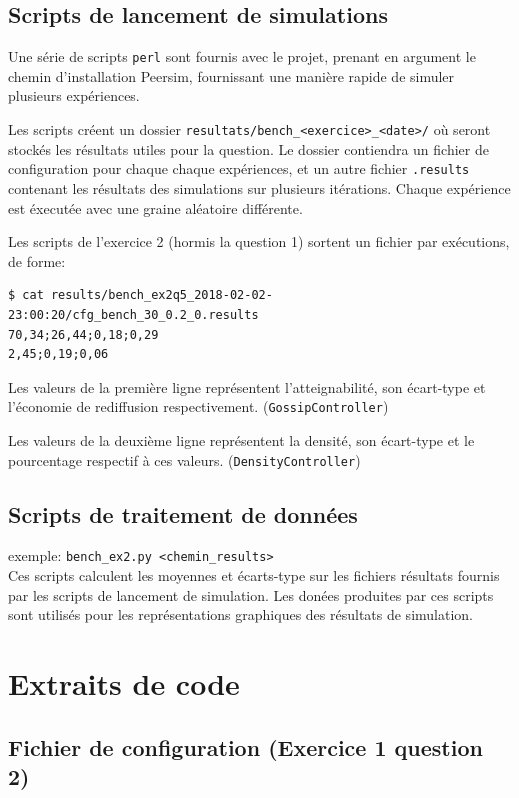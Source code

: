 \documentclass[a4paper]{article}
\begin{document}
\begin{appendix}
    \subsection{Scripts de lancement de simulations}
    Une série de scripts \texttt{perl} sont fournis avec le projet,
    prenant en argument le chemin d'installation Peersim, fournissant
    une manière rapide de simuler plusieurs expériences.

    Les scripts créent un dossier \texttt{resultats/bench\_<exercice>\_<date>/} où seront stockés les
    résultats utiles pour la question. Le dossier contiendra
    un fichier de configuration pour chaque chaque expériences, et un
    autre fichier \texttt{.results} contenant les résultats des
    simulations sur plusieurs itérations. Chaque expérience est éxecutée avec une graine aléatoire différente.


Les scripts de l'exercice 2 (hormis la question 1) sortent un fichier
par exécutions, de forme:

\begin{verbatim}
$ cat results/bench_ex2q5_2018-02-02-23:00:20/cfg_bench_30_0.2_0.results
70,34;26,44;0,18;0,29
2,45;0,19;0,06
\end{verbatim}




Les valeurs de la première ligne représentent l'atteignabilité, son
écart-type et l'économie de rediffusion
respectivement. (\texttt{GossipController})


Les valeurs de la deuxième ligne représentent la densité, son
écart-type et le pourcentage respectif à ces valeurs. (\texttt{DensityController})

\subsection{Scripts de traitement de données}
exemple: \texttt{bench\_ex2.py <chemin\_results>}\\
Ces scripts calculent les moyennes et écarts-type sur les fichiers
résultats fournis par les scripts de lancement de simulation. Les
donées produites par ces scripts sont utilisés pour les
représentations graphiques des résultats de simulation.


\section{Extraits de code}


\subsection{Fichier de configuration (Exercice 1 question 2)}


\end{appendix}
\end{document}
